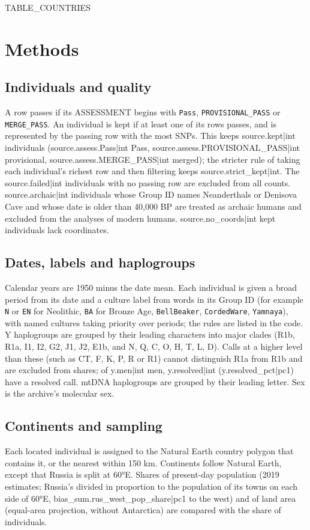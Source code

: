 \documentclass[11pt,a4paper]{article}
\begin{document}
{{TABLE_COUNTRIES}}

\section{Methods}
\subsection{Individuals and quality}
A row passes if its ASSESSMENT begins with \texttt{Pass}, \texttt{PROVISIONAL\_PASS} or \texttt{MERGE\_PASS}. An individual is kept if at least one of its rows passes, and is represented by the passing row with the most SNPs. This keeps {{source.kept|int}} individuals ({{source.assess.Pass|int}} Pass, {{source.assess.PROVISIONAL_PASS|int}} provisional, {{source.assess.MERGE_PASS|int}} merged); the stricter rule of taking each individual's richest row and then filtering keeps {{source.strict_kept|int}}. The {{source.failed|int}} individuals with no passing row are excluded from all counts. {{source.archaic|int}} individuals whose Group ID names Neanderthals or Denisova Cave and whose date is older than 40,000 BP are treated as archaic humans and excluded from the analyses of modern humans. {{source.no_coords|int}} kept individuals lack coordinates.

\subsection{Dates, labels and haplogroups}
Calendar years are 1950 minus the date mean. Each individual is given a broad period from its date and a culture label from words in its Group ID (for example \texttt{N} or \texttt{EN} for Neolithic, \texttt{BA} for Bronze Age, \texttt{BellBeaker}, \texttt{CordedWare}, \texttt{Yamnaya}), with named cultures taking priority over periods; the rules are listed in the code. Y haplogroups are grouped by their leading characters into major clades (R1b, R1a, I1, I2, G2, J1, J2, E1b, and N, Q, C, O, H, T, L, D). Calls at a higher level than these (such as CT, F, K, P, R or R1) cannot distinguish R1a from R1b and are excluded from shares; of {{y.men|int}} men, {{y.resolved|int}} ({{y.resolved_pct|pc1}}) have a resolved call. mtDNA haplogroups are grouped by their leading letter. Sex is the archive's molecular sex.

\subsection{Continents and sampling}
Each located individual is assigned to the Natural Earth country polygon that contains it, or the nearest within 150 km. Continents follow Natural Earth, except that Russia is split at 60°E. Shares of present-day population (2019 estimates; Russia's divided in proportion to the population of its towns on each side of 60°E, {{bias_sum.rus_west_pop_share|pc1}} to the west) and of land area (equal-area projection, without Antarctica) are compared with the share of individuals.
\end{document}
